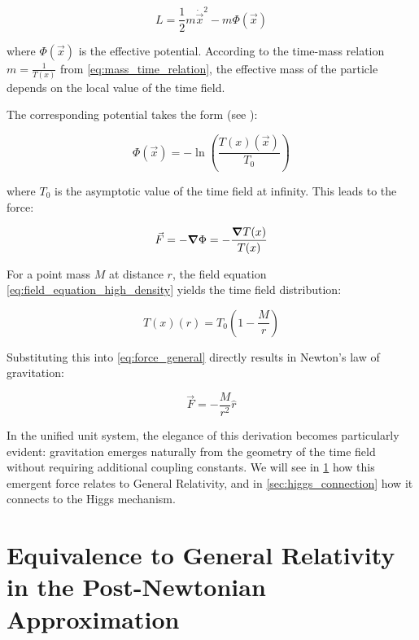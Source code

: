 \documentclass[12pt,a4paper]{article}
\newcommand{\Tfield}{T(x)}
\newcommand{\Tzero}{T_0}
\newcommand{\vecx}{\vec{x}}
\begin{document}
	\begin{equation}
		\label{eq:particle_lagrangian}
		L = \frac{1}{2}m\dot{\vecx}^2 - m\Phi(\vecx)
	\end{equation}
	
	where \(\Phi(\vecx)\) is the effective potential. According to the time-mass relation \(m = \frac{1}{\Tfield}\) from \cref{eq:mass_time_relation}, the effective mass of the particle depends on the local value of the time field.
	
	The corresponding potential takes the form (see \cite{pascher_galaxies_2025}):
	
	\begin{equation}
		\label{eq:effective_potential}
		\Phi(\vecx) = -\ln\left(\frac{\Tfield(\vecx)}{\Tzero}\right)
	\end{equation}
	
	where \(\Tzero\) is the asymptotic value of the time field at infinity. This leads to the force:
	
	\begin{equation}
		\label{eq:force_general}
		\vec{F} = -\grad \Phi = -\frac{\grad \Tfield}{\Tfield}
	\end{equation}
	
	For a point mass \(M\) at distance \(r\), the field equation \cref{eq:field_equation_high_density} yields the time field distribution:
	
	\begin{equation}
		\label{eq:time_field_point_mass}
		\Tfield(r) = \Tzero\left(1 - \frac{M}{r}\right)
	\end{equation}
	
	Substituting this into \cref{eq:force_general} directly results in Newton's law of gravitation:
	
	\begin{equation}
		\label{eq:newton_law}
		\vec{F} = -\frac{M}{r^2} \hat{r}
	\end{equation}
	
	In the unified unit system, the elegance of this derivation becomes particularly evident: gravitation emerges naturally from the geometry of the time field without requiring additional coupling constants. We will see in \cref{sec:gr_equivalence} how this emergent force relates to General Relativity, and in \cref{sec:higgs_connection} how it connects to the Higgs mechanism.
	
	\section{Equivalence to General Relativity in the Post-Newtonian Approximation}
	\label{sec:gr_equivalence}
	
\end{document}
